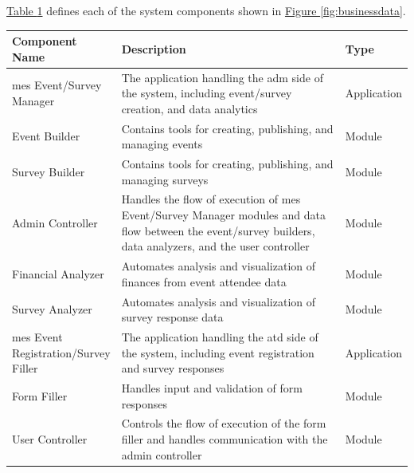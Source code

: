 \documentclass[12pt]{article}
\begin{document}
\hyperref[table:datadictionary]{Table \ref{table:datadictionary}} defines each of the system components shown in \hyperref[fig:businessdata]{Figure \ref{fig:businessdata}}.
{
\setlength{\tabcolsep}{0.3em}
\renewcommand{\arraystretch}{1.2}
\begin{table}[H]
    \begin{tabular}{p{0.25\linewidth}p{0.6\linewidth}p{0.2\linewidth}}
      \toprule
      \textbf{Component Name}              & \textbf{Description}                                                                                                                                       & \textbf{Type} \\ \midrule
        \gls{mes} Event/Survey Manager             & The application handling the \gls{adm} side of the system, including event/survey creation, and data analytics                                                 & Application   \\ \midrule
        Event Builder                        & Contains tools for creating, publishing, and managing events                                                                                               & Module        \\ \midrule
        Survey Builder                       & Contains tools for creating, publishing, and managing surveys                                                                                              & Module        \\ \midrule
        Admin Controller                     & Handles the flow of execution of \gls{mes} Event/Survey Manager modules and data flow between the event/survey builders, data analyzers, and the user controller & Module        \\ \midrule
        Financial Analyzer                   & Automates analysis and visualization of finances from event attendee data                                                                                  & Module        \\ \midrule
        Survey Analyzer                      & Automates analysis and visualization of survey response data                                                                                               & Module        \\ \midrule
        \gls{mes} Event Registration/Survey Filler & The application handling the \gls{atd} side of the system, including event registration and survey responses                                                    & Application   \\ \midrule
        Form Filler                          & Handles input and validation of form responses                                                                                                             & Module        \\ \midrule
        User Controller                      & Controls the flow of execution of the form filler and handles communication with the admin controller                                                      & Module        \\ \midrule
    \end{tabular}
    \label{table:datadictionary}
\end{table}
}
\end{document}
